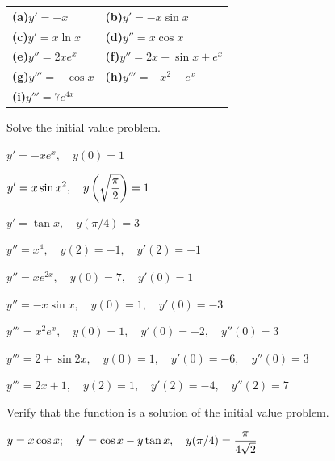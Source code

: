 \begin{exerciselist}
  \begin{tabular}[t]{@{}p{168pt}@{}p{168pt}}
    {\bf (a)}\quad $y'=-x$        & {\bf (b)}\quad $y'=-x\sin x$         \\
    {\bf (c)}\quad $y'=x\ln x$    & {\bf (d)}\quad $y''=x\cos x$         \\
    {\bf (e)}\quad $y''=2xe^{x}$  & {\bf (f)}\quad $y''=2x+\sin x+e^{x}$ \\
    {\bf (g)}\quad $y'''=-\cos x$ & {\bf (h)}\quad $y'''=-x^{2}+e^{x}$   \\
    {\bf (i)}\quad $y'''=7e^{4x}$ &
  \end{tabular}

  \item\label{exer:1.2.4} Solve the initial value problem.

  \begin{alist}
    \item %
    $y'=-xe^{x},\quad y(0)=1$

    \item %
    $\displaystyle{y'=x\sin x^{2},\quad y\left({\sqrt{\frac{\pi}{2}}}\right)=1}$

    \item %
    $y'=\tan x,\quad y(\pi/4)=3$

    \item %
    $y''=x^{4},\quad y(2)=-1,\quad y'(2)=-1$

    \item %
    $y''=xe^{2x},\quad y(0)=7,\quad y'(0)=1$

    \item %
    $y''=-x\sin x,\quad y(0)=1,\quad y'(0)=-3$

    \item %
    $y'''=x^{2}e^{x},\quad y(0)=1,\quad y'(0)=-2,\quad y''(0)=3$

    \item %
    $y'''=2+\sin2x,\quad y(0)=1,\quad y'(0)=-6,\quad y''(0)=3$

    \item %
    $y'''=2x+1,\quad y(2)=1,\quad y'(2)=-4,\quad y''(2)=7$
  \end{alist}

  \item\label{exer:1.2.5} Verify that the function is a solution of the initial value problem.

  \begin{alist}
    \item %
    $y=x\cos x;\quad y'=\cos x-y\tan x,\quad y(\pi/4)=\displaystyle\frac{\pi}{4\sqrt{2}}$


\end{alist}
\end{exerciselist}
